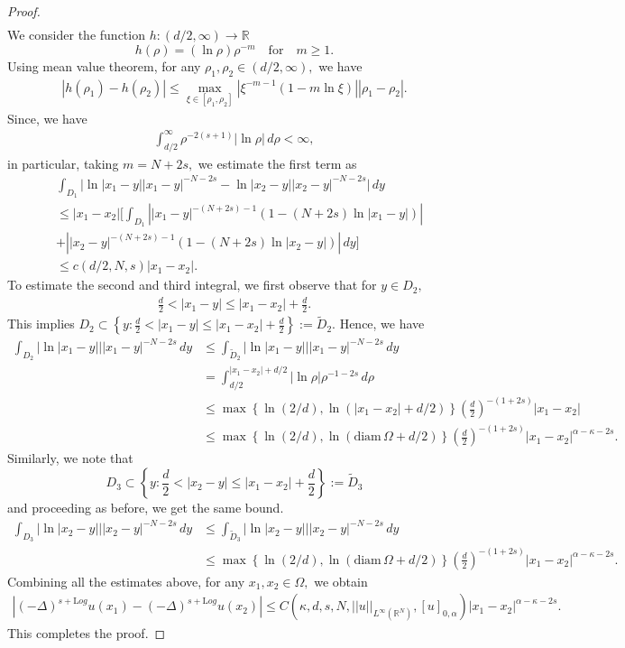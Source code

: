 \documentclass[10pt,a4paper]{amsart}
\newcommand{\RR}{\mathds{R}}
\begin{document}
\begin{proof}
\begin{align*}
\end{align*}
We consider the function $h: (d/2, \infty)\to \mathbb{R}$ 
\[h(\rho)=(\ln \rho)\rho^{-m}\quad \text{for}\quad m\geq 1.\] Using mean value theorem, for any $\rho_1, \rho_2\in (d/2, \infty),$ we have
\begin{align*}
    \left|h(\rho_1)-h(\rho_2)\right|\leq \max_{\xi \in [\rho_1, \rho_2]}\left|\xi^{-m-1}(1-m\ln \xi)\right||\rho_1-\rho_2|.
\end{align*}
Since, we have 
\begin{align*}
    \int_{d/2}^{\infty}\rho^{-2(s+1)}|\ln \rho|\, d\rho< \infty,
\end{align*} in particular, taking $m=N+2s,$
we estimate the first term as
\begin{align*}
 &\int_{D_1}\Big|\ln |x_1-y||x_1-y|^{-N-2s}-\ln |x_2-y||x_2-y|^{-N-2s}\Big|\, dy\\
 &\leq |x_1-x_2|\Bigg[\int_{D_1}\left||x_1-y|^{-(N+2s)-1}\left(1-(N+2s)\ln |x_1-y|\right)\right|\\
 &+\left||x_2-y|^{-(N+2s)-1}\left(1-(N+2s)\ln |x_2-y|\right)\right|\,dy\Bigg]\\
 &\leq c(d/2, N, s)|x_1-x_2|.
\end{align*}
To estimate the second and third integral, we first observe that for $y \in D_2,$
\begin{align*}
\frac{d}{2}< |x_1-y|\leq |x_1-x_2|+ \frac{d}{2}.
\end{align*}
This implies $D_2 \subset \left\{y : \frac{d}{2}< |x_1-y|\leq |x_1-x_2|+ \frac{d}{2}\right\}:=\widetilde D_2.$ Hence, we have
\begin{align*}
  \int_{D_2}|\ln |x_1-y|||x_1-y|^{-N-2s}\, dy &\leq \int_{\widetilde D_2} |\ln |x_1-y|||x_1-y|^{-N-2s}\, dy\\
  &=\int_{d/2}^{|x_1-x_2|+d/2}|\ln \rho|\rho^{-1-2s}\,d\rho\\
  &\leq \max\left\{\ln (2/d), \ln (|x_1-x_2|+d/2)\right\}(\frac{d}{2})^{-(1+2s)}|x_1-x_2|\\
  &\leq \max\left\{\ln (2/d), \ln (\text{diam}\, \Omega+d/2)\right\}(\frac{d}{2})^{-(1+2s)}|x_1-x_2|^{\alpha-\kappa-2s}.
\end{align*}
Similarly, we note that 
\[D_3 \subset \left\{y : \frac{d}{2}< |x_2-y|\leq |x_1-x_2|+ \frac{d}{2} \right\}:=\widetilde D_3\] and proceeding as before, we get the same bound.
\begin{align*}
\int_{D_3}|\ln |x_2-y|||x_2-y|^{-N-2s}\, dy &\leq \int_{\widetilde D_3} |\ln |x_2-y|||x_2-y|^{-N-2s}\, dy\\
&\leq  \max\left\{\ln (2/d), \ln (\text{diam}\, \Omega+d/2)\right\}(\frac{d}{2})^{-(1+2s)}|x_1-x_2|^{\alpha-\kappa-2s}.
\end{align*}
Combining all the estimates above, for any $x_1, x_2 \in \Omega,$ we obtain 
\begin{align*}
|(-\Delta)^{s+\mathrm Log} u(x_1)-(-\Delta)^{s+\mathrm Log}u(x_2)| \leq C(\kappa, d, s, N,  ||u||_{L^{\infty}(\RR^N)}, [u]_{0, \alpha})|x_1-x_2|^{\alpha-\kappa-2s}.
\end{align*} This completes the proof. 
\end{proof}
\end{document}
